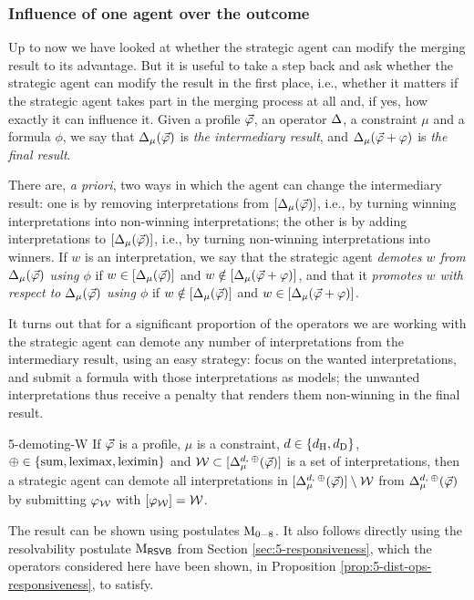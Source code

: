\subsubsection{Influence of one agent over the outcome}
Up to now we have looked at whether the strategic agent can modify the merging result to its advantage.
But it is useful to take a step back and ask whether the strategic agent can modify the result in the first place,
i.e., whether it matters if the strategic agent takes part in the merging process at all and, if yes,
how exactly it can influence it.
Given a profile $\P$, an operator $\me$, a constraint $\mu$ and a formula $\phi$,
we say that $\me_{\mu}(\P)$ is \emph{the intermediary result}, 
and $\me_{\mu}(\P+\phi)$ is \emph{the final result}.

There are, \emph{a priori}, two ways in which the agent can change the intermediary result: 
one is by removing interpretations from $[\me_\mu(\P)]$,
i.e., by turning winning interpretations into non-winning interpretations;
the other is by adding interpretations to $[\me_\mu(\P)]$, i.e., 
by turning non-winning interpretations into winners. 
If $w$ is an interpretation,
we say that the strategic agent \emph{demotes $w$ from $\me_\mu(\P)$ using $\phi$} if 
$w\in[\me_\mu(\P)]$ and $w\notin[\me_\mu(\P+\phi)]$,
and that it \emph{promotes $w$ with respect to $\me_\mu(\P)$ using $\phi$}
if $w\notin[\me_\mu(\P)]$ and $w\in[\me_\mu(\P+\phi)]$.

It turns out that for a significant proportion of the operators we are working with 
the strategic agent can demote any number of interpretations from the intermediary result,
using an easy strategy: focus on the wanted interpretations,
and submit a formula with those interpretations as models; the unwanted interpretations thus receive 
a penalty that renders them non-winning in the final result.

\begin{prp}{}{5-demoting-W}
	If $\P$ is a profile, 
	$\mu$ is a constraint,
	$d\in\set{\dd_\hamming,\dd_\drastic}$, 
	$\agg\in\set{\ssum,\leximax,\leximin}$ 
	and $\W\subset\mods{\me_\mu^{\dd,\:\agg}(\P)}$ is a set of interpretations,
	then a strategic agent can demote all interpretations 
	in $\mods{\me_\mu^{\dd,\:\agg}(\P)}\setminus\W$ from $\me_\mu^{\dd,\:\agg}(\P)$ 
	by submitting $\phi_\W$ with $\mods{\phi_\W}=\W$.
\end{prp}
\begin{prf*}{}{}%
	The result can be shown using postulates $\ppm{0-8}$.
	It also follows directly using the resolvability postulate 
	$\ppm{\RSVB}$ from Section \ref{sec:5-responsiveness},
	which the operators considered here have been shown,
	in Proposition \ref{prop:5-dist-ops-responsiveness}, to satisfy.
\end{prf*}

